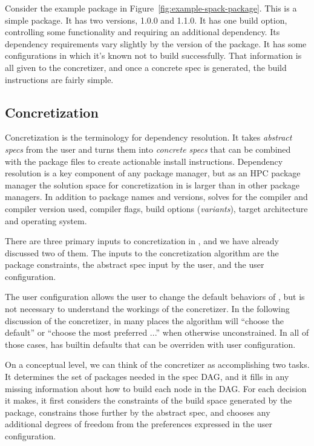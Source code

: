 Consider the example package in Figure~\ref{fig:example-spack-package}. This is a simple package. It has two versions, 1.0.0 and 1.1.0. It has one build option, controlling some functionality and requiring an additional dependency. Its dependency requirements vary slightly by the version of the package. It has some configurations in which it's known not to build successfully. That information is all given to the concretizer, and once a concrete spec is generated, the build instructions are fairly simple.

\subsection{Concretization}
Concretization is the \spack{} terminology for dependency resolution. It takes \emph{abstract specs} from the user and turns them into \emph{concrete specs} that can be combined with the package files to create actionable install instructions.
Dependency resolution is a key component of any package manager, but as an HPC package manager the solution space for concretization in \spack{} is larger than in other package managers.
In addition to package names and versions, \spack{} solves for the compiler and compiler version used, compiler flags, build options (\emph{variants}), target architecture and operating system.

There are three primary inputs to concretization in \spack{}, and we have already discussed two of them. The inputs to the concretization algorithm are the package constraints, the abstract spec input by the user, and the user configuration.

The user configuration allows the user to change the default behaviors of \spack{}, but is not necessary to understand the workings of the concretizer. In the following discussion of the concretizer, in many places the algorithm will ``choose the default'' or ``choose the most preferred ...'' when otherwise unconstrained. In all of those cases, \spack{} has builtin defaults that can be overriden with user configuration.

On a conceptual level, we can think of the concretizer as accomplishing two tasks. It determines the set of packages needed in the spec DAG, and it fills in any missing information about how to build each node in the DAG. For each decision it makes, it first considers the constraints of the build space generated by the package, constrains those further by the abstract spec, and chooses any additional degrees of freedom from the preferences expressed in the user configuration.

